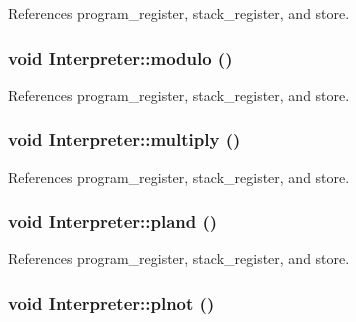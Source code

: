 References program\_\-register, stack\_\-register, and store.

\hypertarget{classInterpreter_a88b9baaecb6f18e2266b54be7f5f6817}{
\subsubsection[{modulo}]{\setlength{\rightskip}{0pt plus 5cm}void Interpreter::modulo ()}}
\label{classInterpreter_a88b9baaecb6f18e2266b54be7f5f6817}


References program\_\-register, stack\_\-register, and store.

\hypertarget{classInterpreter_a030165f73b064a2e22216b8dbb659259}{
\subsubsection[{multiply}]{\setlength{\rightskip}{0pt plus 5cm}void Interpreter::multiply ()}}
\label{classInterpreter_a030165f73b064a2e22216b8dbb659259}


References program\_\-register, stack\_\-register, and store.

\hypertarget{classInterpreter_ac5a0b960cbc8c7ff686c127ccf806c09}{
\subsubsection[{pland}]{\setlength{\rightskip}{0pt plus 5cm}void Interpreter::pland ()}}
\label{classInterpreter_ac5a0b960cbc8c7ff686c127ccf806c09}


References program\_\-register, stack\_\-register, and store.

\hypertarget{classInterpreter_a74d15a1c501fbe26b66e4d44a86a57eb}{
\subsubsection[{plnot}]{\setlength{\rightskip}{0pt plus 5cm}void Interpreter::plnot ()}}
\label{classInterpreter_a74d15a1c501fbe26b66e4d44a86a57eb}


